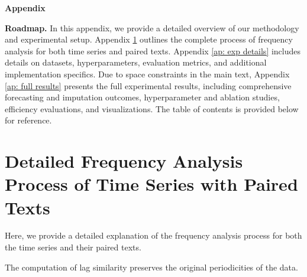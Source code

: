 
\textbf{\LARGE Appendix}

\textbf{Roadmap.} 
In this appendix, we provide a detailed overview of our methodology and experimental setup. Appendix \ref{ap: detailed frequency analysis} outlines the complete process of frequency analysis for both time series and paired texts. Appendix \ref{ap: exp details} includes details on datasets, hyperparameters, evaluation metrics, and additional implementation specifics. Due to space constraints in the main text, Appendix \ref{ap: full results} presents the full experimental results, including comprehensive forecasting and imputation outcomes, hyperparameter and ablation studies, efficiency evaluations, and visualizations. The table of contents is provided below for reference.


\renewcommand*\contentsname{\Large Table of Contents}

\tableofcontents
\clearpage

\section{Detailed Frequency Analysis Process of Time Series with Paired Texts}
\label{ap: detailed frequency analysis}

Here, we provide a detailed explanation of the frequency analysis process for both the time series and their paired texts.

\begin{proposition}
\label{proposition: lag similarity}
    The computation of lag similarity preserves the original periodicities of the data.
\end{proposition}

